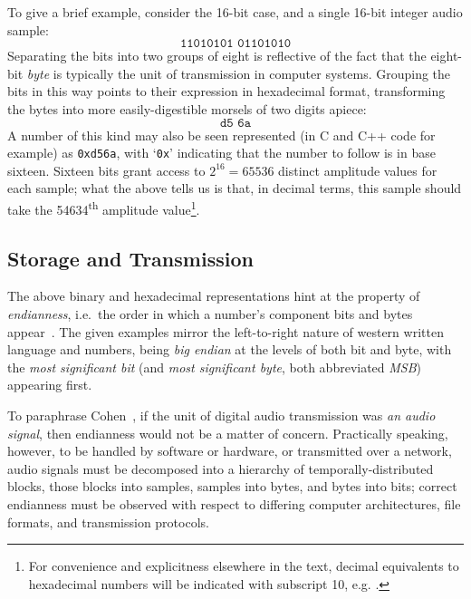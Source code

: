 To give a brief example, consider the 16-bit case, and a single 16-bit integer
audio sample:
\begin{equation*}
    \texttt{11010101 01101010}
\end{equation*}
Separating the bits into two groups of eight is reflective of the fact that the
eight-bit \textit{byte} is typically the unit of transmission in computer
systems.
Grouping the bits in this way points to their expression in hexadecimal format,
transforming the bytes into more easily-digestible morsels of two digits apiece:
\begin{equation*}
    \texttt{d5 6a}
\end{equation*}
A number of this kind may also be seen represented (in C and C++ code for
example) as \texttt{0xd56a}, with `\texttt{0x}' indicating that the number to
follow is in base sixteen.
Sixteen bits grant access to $2^{16}=\num{65536}$ distinct amplitude values for
each sample; what the above tells us is that, in decimal terms, this sample
should take the \num{54634}\textsuperscript{th} amplitude value\footnote{
    For convenience and explicitness elsewhere in the text, decimal equivalents
    to hexadecimal numbers will be indicated with subscript 10, e.g.
    .
}.

\subsection{Storage and Transmission}\label{subsec:storage-and-transmission}

The above binary and hexadecimal representations hint at the property of
\textit{endianness}, i.e.\ the order in which a number's component bits and
bytes appear~\citep{cohen_holy_1981}.
The given examples mirror the left-to-right nature of western written language
and numbers, being \textit{big endian} at the levels of both bit and byte, with
the \textit{most significant bit} (and \textit{most significant byte}, both
abbreviated \textit{MSB}) appearing first.

To paraphrase Cohen~\citep{cohen_holy_1981}, if the unit of digital audio
transmission was \textit{an audio signal}, then endianness would not be a
matter of concern.
Practically speaking, however, to be handled by software or hardware, or
transmitted over a network, audio signals must be decomposed into a hierarchy
of temporally-distributed blocks, those blocks into samples, samples into bytes,
and bytes into bits;
correct endianness must be observed with respect to differing computer
architectures, file formats, and transmission protocols.

